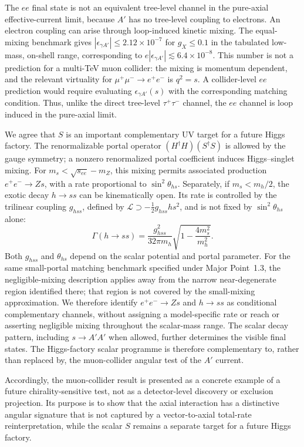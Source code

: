 \documentclass[12pt,a4paper]{article}
\begin{document}
The \(ee\) final state is not an equivalent tree-level channel in the pure-axial effective-current limit, because \(A'\) has no tree-level coupling to electrons. An electron coupling can arise through loop-induced kinetic mixing. The equal-mixing benchmark gives \(|\epsilon_{\gamma A'}|\leq2.12\times10^{-7}\) for \(g_X\leq0.1\) in the tabulated low-mass, on-shell range, corresponding to \(e|\epsilon_{\gamma A'}|\lesssim6.4\times10^{-8}\). This number is not a prediction for a multi-TeV muon collider: the mixing is momentum dependent, and the relevant virtuality for \(\mu^+\mu^-\to e^+e^-\) is \(q^2=s\). A collider-level \(ee\) prediction would require evaluating \(\epsilon_{\gamma A'}(s)\) with the corresponding matching condition. Thus, unlike the direct tree-level \(\tau^+\tau^-\) channel, the \(ee\) channel is loop induced in the pure-axial limit.

We agree that \(S\) is an important complementary UV target for a future Higgs factory. The renormalizable portal operator \((H^\dagger H)(S^\dagger S)\) is allowed by the gauge symmetry; a nonzero renormalized portal coefficient induces Higgs--singlet mixing. For \(m_s<\sqrt{s_{ee}}-m_Z\), this mixing permits associated production \(e^+e^-\to Zs\), with a rate proportional to \(\sin^2\theta_{hs}\). Separately, if \(m_s<m_h/2\), the exotic decay \(h\to ss\) can be kinematically open. Its rate is controlled by the trilinear coupling \(g_{hss}\), defined by \(\mathcal L\supset-\tfrac12g_{hss}h s^2\), and is not fixed by \(\sin^2\theta_{hs}\) alone:
\[
\Gamma(h\to ss)=\frac{g_{hss}^2}{32\pi m_h}
\sqrt{1-\frac{4m_s^2}{m_h^2}}.
\]
Both \(g_{hss}\) and \(\theta_{hs}\) depend on the scalar potential and portal parameter. For the same small-portal matching benchmark specified under Major Point~1.3, the negligible-mixing description applies away from the narrow near-degenerate region identified there; that region is not covered by the small-mixing approximation. We therefore identify \(e^+e^-\to Zs\) and \(h\to ss\) as conditional complementary channels, without assigning a model-specific rate or reach or asserting negligible mixing throughout the scalar-mass range. The scalar decay pattern, including \(s\to A'A'\) when allowed, further determines the visible final states. The Higgs-factory scalar programme is therefore complementary to, rather than replaced by, the muon-collider angular test of the \(A'\) current.

Accordingly, the muon-collider result is presented as a concrete example of a future chirality-sensitive test, not as a detector-level discovery or exclusion projection. Its purpose is to show that the axial interaction has a distinctive angular signature that is not captured by a vector-to-axial total-rate reinterpretation, while the scalar \(S\) remains a separate target for a future Higgs factory.
\end{document}
